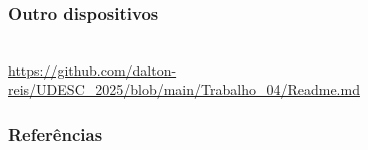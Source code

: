 \documentclass{beamer}
\begin{document}
\begin{frame}
  \frametitle{Outro dispositivos}
  \begin{flushright}
    \cite{reisTrabalho4Interfaces2025} \\
    \url{https://github.com/dalton-reis/UDESC_2025/blob/main/Trabalho_04/Readme.md}
  \end{flushright}
\end{frame}


\begin{frame}
  \frametitle{Referências}
  \begingroup
  \footnotesize
    
    
  \endgroup
\end{frame}
\end{document}
